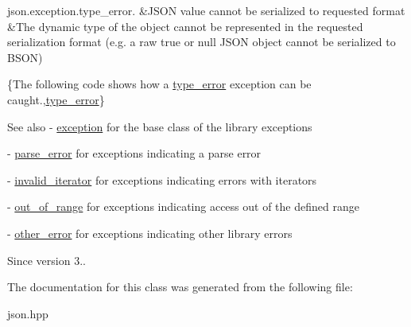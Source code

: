 \begin{longtabu}
json.\+exception.\+type\+\_\+error.  &J\+S\+ON value cannot be serialized to requested format  &The dynamic type of the object cannot be represented in the requested serialization format (e.\+g. a raw {\ttfamily true} or {\ttfamily null} J\+S\+ON object cannot be serialized to B\+S\+ON)   \\
\end{longtabu}


\{The following code shows how a {\ttfamily \mbox{\hyperlink{classnlohmann_1_1detail_1_1type__error}{type\+\_\+error}}} exception can be caught.,\mbox{\hyperlink{classnlohmann_1_1detail_1_1type__error}{type\+\_\+error}}\}

\begin{DoxySeeAlso}{See also}
-\/ \mbox{\hyperlink{classnlohmann_1_1detail_1_1exception}{exception}} for the base class of the library exceptions 

-\/ \mbox{\hyperlink{classnlohmann_1_1detail_1_1parse__error}{parse\+\_\+error}} for exceptions indicating a parse error 

-\/ \mbox{\hyperlink{classnlohmann_1_1detail_1_1invalid__iterator}{invalid\+\_\+iterator}} for exceptions indicating errors with iterators 

-\/ \mbox{\hyperlink{classnlohmann_1_1detail_1_1out__of__range}{out\+\_\+of\+\_\+range}} for exceptions indicating access out of the defined range 

-\/ \mbox{\hyperlink{classnlohmann_1_1detail_1_1other__error}{other\+\_\+error}} for exceptions indicating other library errors
\end{DoxySeeAlso}
\begin{DoxySince}{Since}
version 3.. 
\end{DoxySince}


The documentation for this class was generated from the following file\+:\begin{DoxyCompactItemize}
\item 
json.\+hpp\end{DoxyCompactItemize}
